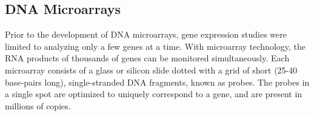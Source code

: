  
\subsection{DNA Microarrays}

 
Prior to the development of DNA microarrays, gene expression studies were limited to analyzing only a few genes at a time. With microarray technology, the RNA products of thousands of genes can be monitored simultaneously. Each microarray consists of a glass or silicon slide dotted with a grid of short (25-40 base-pairs long), single-stranded DNA fragments, known as probes. The probes in a single spot are optimized to uniquely correspond to a gene, and are present in millions of copies. 

